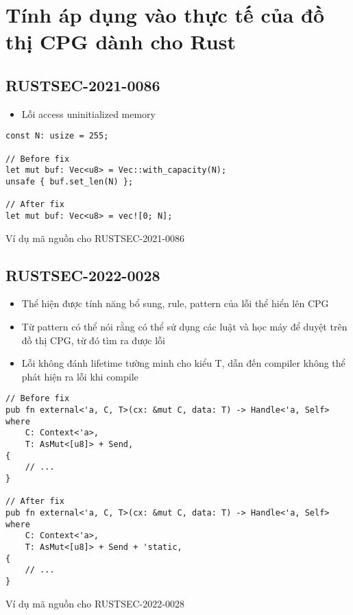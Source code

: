 \section{Tính áp dụng vào thực tế của đồ thị CPG dành cho Rust}

\subsection{RUSTSEC-2021-0086}

\begin{itemize}
    \item Lỗi access uninitialized memory
\end{itemize}

\begin{listing}[H]
\begin{verbatim}
const N: usize = 255;

// Before fix
let mut buf: Vec<u8> = Vec::with_capacity(N);
unsafe { buf.set_len(N) };

// After fix
let mut buf: Vec<u8> = vec![0; N];
\end{verbatim}
\caption{Ví dụ mã nguồn cho RUSTSEC-2021-0086}
\label{code:c4_RUSTSEC-2021-0086}
\end{listing}

\subsection{RUSTSEC-2022-0028}

\begin{itemize}
    \item Thể hiện được tính năng bổ sung, rule, pattern của lỗi thể hiển lên CPG
    \item Từ pattern có thể nói rằng có thể sử dụng các luật và học máy để duyệt trên đồ thị CPG, từ đó tìm ra được lỗi
    \item Lỗi không đánh lifetime tường minh cho kiểu T, dẫn đến compiler không thể phát hiện ra lỗi khi compile
\end{itemize}

\begin{listing}[H]
\begin{verbatim}
// Before fix
pub fn external<'a, C, T>(cx: &mut C, data: T) -> Handle<'a, Self>
where
    C: Context<'a>,
    T: AsMut<[u8]> + Send,
{
    // ...
}

// After fix
pub fn external<'a, C, T>(cx: &mut C, data: T) -> Handle<'a, Self>
where
    C: Context<'a>,
    T: AsMut<[u8]> + Send + 'static,
{
    // ...
}
\end{verbatim}
\caption{Ví dụ mã nguồn cho RUSTSEC-2022-0028}
\label{code:c4_RUSTSEC-2022-0028}
\end{listing}

